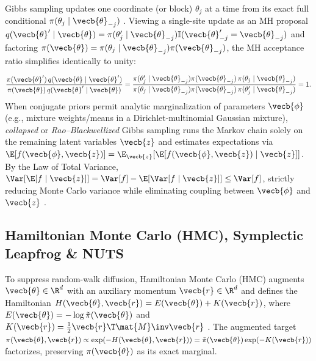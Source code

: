\documentclass[../../../../master.tex]{subfiles}
\begin{document}
{\sloppy Gibbs sampling updates one coordinate (or block) $\theta_j$ at a time from its exact full conditional $\pi(\theta_j \mid \vecb{\theta}_{-j})$  . Viewing a single-site update as an MH proposal $q(\vecb{\theta}' \mid \vecb{\theta}) = \pi(\theta'_j \mid \vecb{\theta}_{-j})\mathbb{I}(\vecb{\theta}'_{-j} = \vecb{\theta}_{-j})$ and factoring $\pi(\vecb{\theta}) = \pi(\theta_j \mid \vecb{\theta}_{-j})\pi(\vecb{\theta}_{-j})$, the MH acceptance ratio simplifies identically to unity:\par}
\begin{equation}
  \label{eq:mcmc:gibbs_accept}
  \frac{\pi(\vecb{\theta}')\,q(\vecb{\theta} \mid \vecb{\theta}')}{\pi(\vecb{\theta})\,q(\vecb{\theta}' \mid \vecb{\theta})}
  = \frac{\pi(\theta'_j \mid \vecb{\theta}_{-j})\pi(\vecb{\theta}_{-j})\,\pi(\theta_j \mid \vecb{\theta}_{-j})}{\pi(\theta_j \mid \vecb{\theta}_{-j})\pi(\vecb{\theta}_{-j})\,\pi(\theta'_j \mid \vecb{\theta}_{-j})} = 1.
\end{equation}
When conjugate priors permit analytic marginalization of parameters $\vecb{\phi}$ (e.g., mixture weights/means in a Dirichlet-multinomial Gaussian mixture), \emph{collapsed} or \emph{Rao--Blackwellized} Gibbs sampling runs the Markov chain solely on the remaining latent variables $\vecb{z}$ and estimates expectations via $\E[f(\vecb{\phi}, \vecb{z})] = \E_{\vecb{z}}[\E[f(\vecb{\phi}, \vecb{z}) \mid \vecb{z}]]$. By the Law of Total Variance, $\Var[\E[f \mid \vecb{z}]] = \Var[f] - \E[\Var[f \mid \vecb{z}]] \le \Var[f]$, strictly reducing Monte Carlo variance while eliminating coupling between $\vecb{\phi}$ and $\vecb{z}$ .

\subsection{Hamiltonian Monte Carlo (HMC), Symplectic Leapfrog \& NUTS}
\label{subsec:mcmc:hmc}

To suppress random-walk diffusion, Hamiltonian Monte Carlo (HMC) augments $\vecb{\theta} \in \R^d$ with an auxiliary momentum $\vecb{r} \in \R^d$ and defines the Hamiltonian $H(\vecb{\theta}, \vecb{r}) = E(\vecb{\theta}) + K(\vecb{r})$, where $E(\vecb{\theta}) = -\log\tilde{\pi}(\vecb{\theta})$ and $K(\vecb{r}) = \frac{1}{2}\vecb{r}\T \mat{M}\inv \vecb{r}$ . The augmented target $\pi(\vecb{\theta}, \vecb{r}) \propto \exp(-H(\vecb{\theta}, \vecb{r})) = \tilde{\pi}(\vecb{\theta})\exp(-K(\vecb{r}))$ factorizes, preserving $\pi(\vecb{\theta})$ as its exact marginal.
\end{document}
